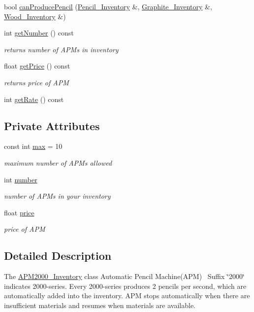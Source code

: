 \begin{DoxyCompactItemize}
bool \hyperlink{classAPM2000__Inventory_a57eae269c4c67d3133175d6006373d2b}{can\+Produce\+Pencil} (\hyperlink{classPencil__Inventory}{Pencil\+\_\+\+Inventory} \&, \hyperlink{classGraphite__Inventory}{Graphite\+\_\+\+Inventory} \&, \hyperlink{classWood__Inventory}{Wood\+\_\+\+Inventory} \&)
\item 
int \hyperlink{classAPM2000__Inventory_a9a9bacffea28885b6c268d9a3bcab401}{get\+Number} () const
\begin{DoxyCompactList}\small\item\em returns number of A\+P\+Ms in inventory \end{DoxyCompactList}\item 
float \hyperlink{classAPM2000__Inventory_a65388780b7aa2066cfaf86c85d501765}{get\+Price} () const
\begin{DoxyCompactList}\small\item\em returns price of A\+PM \end{DoxyCompactList}\item 
int \hyperlink{classAPM2000__Inventory_ab20a0adafade1bdefea0e8d8c6b271a0}{get\+Rate} () const
\end{DoxyCompactItemize}
\subsection*{Private Attributes}
\begin{DoxyCompactItemize}
\item 
const int \hyperlink{classAPM2000__Inventory_a098109b5a53ce171fb405e552bf056b2}{max} = 10
\begin{DoxyCompactList}\small\item\em maximum number of A\+P\+Ms allowed \end{DoxyCompactList}\item 
int \hyperlink{classAPM2000__Inventory_a0393939ee2dd57ec3855bb98070da2ad}{number}
\begin{DoxyCompactList}\small\item\em number of A\+P\+Ms in your inventory \end{DoxyCompactList}\item 
float \hyperlink{classAPM2000__Inventory_a56588e2f627cbe3fccf6235773d77889}{price}
\begin{DoxyCompactList}\small\item\em price of A\+PM \end{DoxyCompactList}\end{DoxyCompactItemize}


\subsection{Detailed Description}
The \hyperlink{classAPM2000__Inventory}{A\+P\+M2000\+\_\+\+Inventory} class Automatic Pencil Machine(\+A\+P\+M)~\newline
Suffix \char`\"{}2000\char`\"{} indicates 2000-\/series. Every 2000-\/series produces 2 pencils per second, which are automatically added into the inventory. A\+PM stops automatically when there are insufficient materials and resumes when materials are available. 

